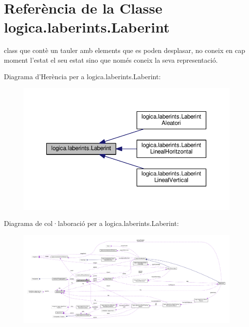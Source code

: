 \hypertarget{classlogica_1_1laberints_1_1_laberint}{\section{Referència de la Classe logica.\+laberints.\+Laberint}
\label{classlogica_1_1laberints_1_1_laberint}
}


class que contè un tauler amb elements que es poden desplasar, no coneix en cap moment l'estat el seu estat sino que només coneix la seva representació.  




Diagrama d'Herència per a logica.\+laberints.\+Laberint\+:
\nopagebreak
\begin{figure}[H]
\begin{center}
\leavevmode
\includegraphics[width=350pt]{classlogica_1_1laberints_1_1_laberint__inherit__graph}
\end{center}
\end{figure}


Diagrama de col·laboració per a logica.\+laberints.\+Laberint\+:
\nopagebreak
\begin{figure}[H]
\begin{center}
\leavevmode
\includegraphics[width=350pt]{classlogica_1_1laberints_1_1_laberint__coll__graph}
\end{center}
\end{figure}
